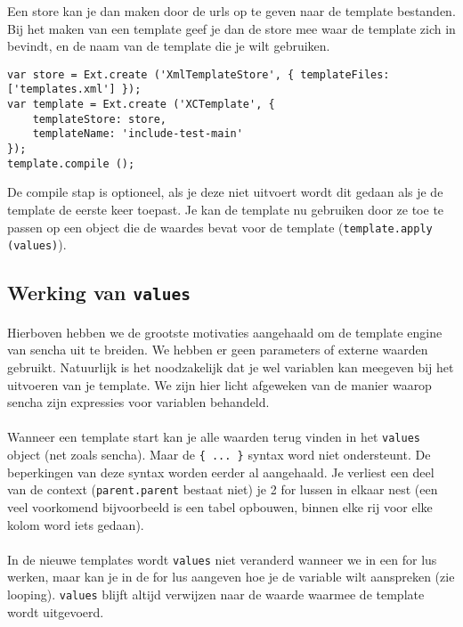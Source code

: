 Een store kan je dan maken door de urls op te geven naar de template bestanden. Bij het
maken van een template geef je dan de store mee waar de template zich in bevindt, en de
naam van de template die je wilt gebruiken.

\begin{lstlisting}[language=ownjavascript]
var store = Ext.create ('XmlTemplateStore', { templateFiles: ['templates.xml'] });
var template = Ext.create ('XCTemplate', {
	templateStore: store,
	templateName: 'include-test-main'
});
template.compile ();
\end{lstlisting}

De compile stap is optioneel, als je deze niet uitvoert wordt dit gedaan als je de
template de eerste keer toepast. Je kan de template nu gebruiken door ze toe te passen op
een object die de waardes bevat voor de template (\lstinline{template.apply (values)}).


\subsection {Werking van \lstinline {values}}

\paragraph {} Hierboven hebben we de grootste motivaties aangehaald om de template engine
van sencha uit te breiden. We hebben er geen parameters of externe waarden gebruikt.
Natuurlijk is het noodzakelijk dat je wel variablen kan meegeven bij het uitvoeren van je
template. We zijn hier licht afgeweken van de manier waarop sencha zijn expressies voor
variablen behandeld.

\paragraph {} Wanneer een template start kan je alle waarden terug vinden in het
\lstinline{values} object (net zoals sencha). Maar de \lstinline|{ ... }| syntax word niet
ondersteunt. De beperkingen van deze syntax worden eerder al aangehaald. Je verliest een
deel van de context (\lstinline{parent.parent} bestaat niet) je 2 for lussen in elkaar
nest (een veel voorkomend bijvoorbeeld is een tabel opbouwen, binnen elke rij voor elke
kolom word iets gedaan).

\paragraph {} In de nieuwe templates wordt \lstinline{values} niet veranderd wanneer we
in een for lus werken, maar kan je in de for lus aangeven hoe je de variable wilt
aanspreken (zie looping). \lstinline{values} blijft altijd verwijzen naar de waarde
waarmee de template wordt uitgevoerd.


